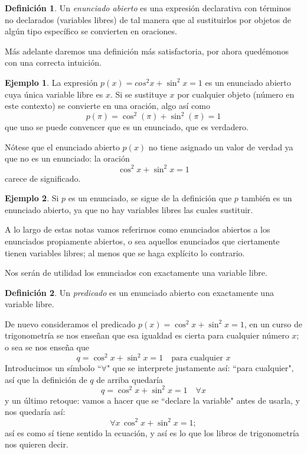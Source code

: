 \documentclass{book}
\theoremstyle{definition}
\newtheorem{df}{Definición}[chapter]
\newtheorem{ejm}{Ejemplo}[chapter]
\begin{document}
\begin{df}
	Un \emph{enunciado abierto} es una expresión declarativa con términos no declarados (variables libres) de tal manera que al sustituirlos por objetos de algún tipo específico se convierten en oraciones.
\end{df}
Más adelante daremos una definición más satisfactoria, por ahora quedémonos con una correcta intuición.
\begin{ejm}
	La expresión $p(x) = cos^2 x + \sin^2 x = 1$ es un enunciado abierto cuya única variable libre es $x$.
	Si se sustituye $x$ por cualquier objeto (número en este contexto) se convierte en una oración, algo así como \[p(\pi) = \cos^2(\pi) + \sin^2(\pi) = 1\]
	que uno se puede convencer que es un enunciado, que es verdadero.
	
	Nótese que el enunciado abierto $p(x)$ no tiene asignado un valor de verdad ya que no es un enunciado: la oración \[\cos^2 x + \sin^2 x = 1\]
	carece de significado.
\end{ejm}
\begin{ejm}
	Si $p$ es un enunciado, se sigue de la definición que $p$ también es un enunciado abierto, ya que no hay variables libres las cuales sustituir.
	
	A lo largo de estas notas vamos referirnos como enunciados abiertos a los enunciados propiamente abiertos, o sea aquellos enunciados que ciertamente tienen variables libres; al menos que se haga explícito lo contrario.
\end{ejm}
Nos serán de utilidad los enunciados con exactamente una variable libre.
\begin{df}
	Un \emph{predicado} es un enunciado abierto con exactamente una variable libre. 
\end{df}
De nuevo consideramos el predicado $p(x) = \cos^2 x + \sin^2 x = 1$, en un curso de trigonometría se nos enseñan que esa igualdad es cierta para cualquier número $x$; o sea se nos enseña que
\[q = \cos^2 x + \sin^2 x = 1\quad \text{para cualquier } x \]
Introducimos un símbolo ``$\forall$" que se interprete justamente así: ``para cualquier", así que la definición de $q$ de arriba quedaría
\[q = \cos^2 x + \sin^2 x = 1\quad \forall x\]
y un último retoque: vamos a hacer que se ``declare la variable" antes de usarla, y nos quedaría así:
\begin{equation}
	\forall x\, \cos^2 x + \sin^2 x = 1;
\end{equation}
así es como sí tiene sentido la ecuación, y así es lo que los libros de trigonometría nos quieren decir.
\end{document}
